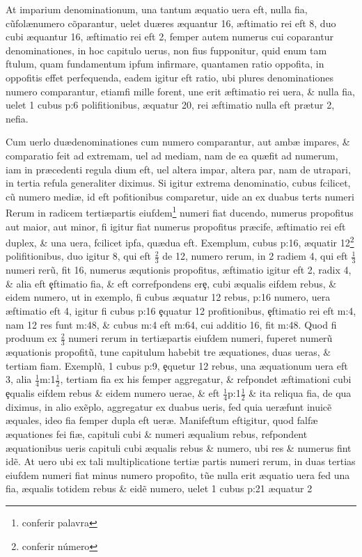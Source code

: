  At imparium denominationum, una tantum {\ae}quatio uera eft, nulla fi{\ct}a, c\~{u}fol\ae numero c\~{o}parantur, uelet du\ae res {\ae}quantur 16, {\ae}ftimatio rei eft 8, duo cubi {\ae}quantur 16, {\ae}ftimatio rei eft 2, femper autem numerus cui coparantur denominationes, in hoc capitulo uerus, non fi{\ct}us fupponitur, quid enum tam ftulum, quam fundamentum ipfum infirmare, quan{\que}tamen ratio oppofita, in oppofitis effet perfequenda, eadem igitur eft ratio, ubi plures denominationes numero comparantur, etiamfi mille forent, une erit {\ae}ftimatio rei uera, \& nulla fi{\ct}a, uelet 1 cubus p:6 polifitionibus, {\ae}quatur 20, rei {\ae}ftimatio nulla eft pr{\ae}tur 2, ne\que fi{\ct}a.

 Cum uerlo du\ae denominationes cum numero comparantur, aut amb{\ae} impares, \& comparatio feit ad extremam, uel ad mediam, nam de ea qu\ae fit ad numerum, iam in pr{\ae}cedenti regula di{\ct}um eft, uel altera impar, altera par, nam de utra\que pari, in tertia refula generaliter diximus. Si igitur extrema denominatio, cubus fcilicet, c\~{u} numero medi{\ae}, id eft pofitionibus comparetur, uide an ex duabus tert{\nb}s numeri Rerum in radicem terti\ae partis eiufdem\footnote{conferir palavra} numeri fiat ducendo, numerus propofitus aut maior, aut minor, fi igitur fiat numerus propofitus pr{\ae}cife, {\ae}ftimatio rei eft duplex, \& una uera, fcilicet \rdois ipfa, qu\ae du{\ct}a eft. Exemplum, cubus p:16, {\ae}quatir 12\footnote{conferir número} polifitionibus, du{\ct}o igitur 8, qui eft \( \tfrac{2}{3} \) de 12, numero rerum, in 2 radiem 4, qui eft \( \tfrac{1}{3} \) numeri rer\~{u}, fit 16, numerus {\ae}qutionis propofitus, {\ae}ftimatio igitur eft 2, radix 4, \& alia eft \c{e}ftimatio fi{\ct}a, \& eft correfpondens er\c{e}, cubi {\ae}qualis eifdem rebus, \& eidem numero, ut in exemplo, fi cubus {\ae}quatur 12 rebus, p:16 numero, uera {\ae}ftimatio eft 4, igitur fi cubus p:16 \c{e}quatur 12 profitionibus, \c{e}ftimatio rei eft m:4, nam 12 res funt m:48, \& cubus m:4 eft m:64, cui additio 16, fit m:48. Quod fi produ{\ct}um ex \( \tfrac{2}{3} \) numeri rerum in \rdois terti\ae partis eiufdem numeri, fuperet numer\~{u} {\ae}quationis propofit\~{u}, tune capitulum habebit tre {\ae}quationes, duas ueras, \& tertiam fi{\ct}am. Exempl\~{u}, 1 cubus p:9, \c{e}quetur 12 rebus, una {\ae}quationum uera eft 3, alia \( \tfrac{1}{4} \)m:1\( \tfrac{1}{2} \), tertiam fi{\ct}a ex his femper aggregatur, \& refpondet {\ae}ftimationi cubi \c{e}qualis eifdem rebus \& eidem numero uerae, \& eft \( \tfrac{1}{4} \)p:1\( \tfrac{1}{2} \) \& ita reliqua fi{\ct}a, de qua diximus, in alio ex\~{e}plo, aggregatur ex duabus ueris, fed quia uer\ae funt inuic\~{e} {\ae}quales, ideo fi{\ct}a femper dupla eft uer{\ae}. Manifeftum eftigitur, quod falf{\ae} {\ae}quationes fei fi{\ct\ae}, capituli cubi \& numeri {\ae}qualium rebus, refpondent {\ae}quationibus ueris capituli cubi {\ae}qualis rebus \& numero, ubi res \& numerus fint id\~{e}. At uero ubi ex tali multiplicatione \rdois terti{\ae} partis numeri rerum, in duas tertias eiufdem numeri fiat minus numero propofito, t\~{u}e nulla erit {\ae}quatio uera fed una fi{\ct}a, {\ae}qualis totidem rebus \& eid\~{e} numero, uelet 1 cubus p:21 {\ae}quatur 2 